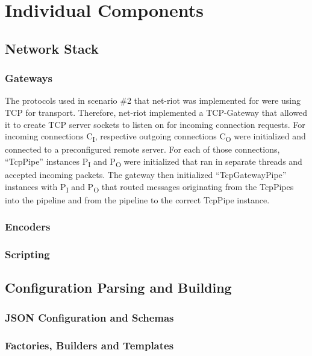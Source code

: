 \section{Individual Components}
\label{sec:individual-components}

\subsection{Network Stack}
\subsubsection{Gateways}
The protocols used in scenario \#2 that net-riot was implemented for were using \ac{TCP} for transport. Therefore, net-riot implemented a \ac{TCP}-Gateway that allowed it to create \ac{TCP} server sockets to listen on for incoming connection requests. For incoming connections C\textsubscript{I}, respective outgoing connections C\textsubscript{O} were initialized and connected to a preconfigured remote server. For each of those connections, \enquote{TcpPipe} instances P\textsubscript{I} and P\textsubscript{O} were initialized that ran in separate threads and accepted incoming packets. The gateway then initialized \enquote{TcpGatewayPipe} instances with P\textsubscript{I} and P\textsubscript{O} that routed messages originating from the TcpPipes into the pipeline and from the pipeline to the correct TcpPipe instance.

\subsubsection{Encoders}

\subsubsection{Scripting}

\subsection{Configuration Parsing and Building}
\subsubsection{JSON Configuration and Schemas}
\subsubsection{Factories, Builders and Templates}
